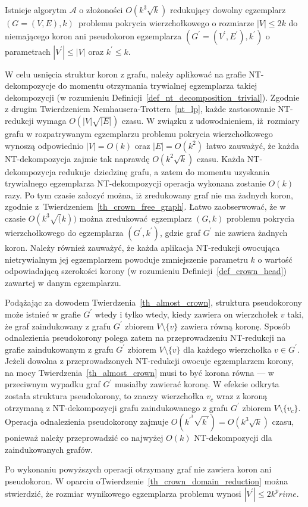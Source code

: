 {  \begin{theorem}
    Istnieje algorytm $\mathcal{A}$ o złożoności $O(k^3\sqrt{k})$ redukujący dowolny egzemplarz $(G=(V, E), k)$ problemu pokrycia wierzchołkowego o rozmiarze $|V|\leq 2k$ do niemającego koron ani pseudokoron egzemplarza $(G^\prime=(V^\prime, E^\prime), k^\prime)$ o parametrach $|V^\prime| \leq |V|$ oraz $k^\prime \leq k$.
  \end{theorem}
  \begin{bproof}
    W celu usnięcia struktur koron z grafu, należy aplikować na grafie NT-dekompozycje do momentu otrzymania trywialnej egzemplarza takiej dekompozycji (w rozumieniu Definicji~\ref{def_nt_decomposition_trivial}).
    Zgodnie z drugim Twierdzeniem Nemhausera-Trottera~\ref{nt_lp}, każde zastosowanie NT-redukcji wymaga $O(|V|\sqrt{|E|})$ czasu.
    W związku z udowodnieniem, iż rozmiary grafu w rozpatrywanym egzemplarzu problemu pokrycia wierzchołkowego wynoszą odpowiednio $|V|=O(k)$ oraz $|E|=O(k^2)$ łatwo zauważyć, że każda NT-dekompozycja zajmie tak naprawdę $O(k^2\sqrt{k})$ czasu.
    Każda NT-dekompozycja redukuje dziedzinę grafu, a zatem do momentu uzyskania trywialnego egzemplarza NT-dekompozycji operacja wykonana zostanie $O(k)$ razy.
    Po tym czasie załozyć można, iż zredukowany graf nie ma żadnych koron, zgodnie z~Twierdzeniem~\ref{th_crown_free_graph}.
    Łatwo zaobserwować, że w czasie $O(k^3\sqrt(k))$ można zredukować egzemplarz $(G, k)$ problemu pokrycia wierzchołkowego do egzemplarza $(G^\prime, k^\prime)$, gdzie graf $G^\prime$ nie zawiera żadnych koron.
    Należy również zauważyć, że każda aplikacja NT-redukcji owocująca nietrywialnym jej egzemplarzem powoduje zmniejszenie parametru $k$ o wartość odpowiadającą szerokości korony (w rozumieniu Definicji~\ref{def_crown_head}) zawartej w danym egzemplarzu.

    Podążając za dowodem Twierdzenia~\ref{th_almost_crown}, struktura pseudokorony może istnieć w grafie $G^\prime$ wtedy i tylko wtedy, kiedy zawiera on wierzchołek $v$ taki, że graf zaindukowany z grafu $G^\prime$ zbiorem $V \setminus \{v\}$ zawiera równą koronę.
    Sposób odnalezienia pseudokorony polega zatem na przeprowadzeniu NT-redukcji na grafie zaindukowanym z grafu $G^\prime$ zbiorem $V \setminus \{v\}$ dla każdego wierzchołka $v \in G^\prime$.
    Jeżeli dowolna z przeprowadzonych NT-redukcji owocuje egzemplarzem korony, na mocy Twierdzenia~\ref{th_almost_crown} musi to być korona równa --- w przeciwnym wypadku graf $G^\prime$ musiałby zawierać koronę.
    W efekcie odkryta została struktura pseudokorony, to znaczy wierzchołka $v_c$ wraz z koroną otrzymaną z NT-dekompozycji grafu zaindukowanego z grafu $G^\prime$ zbiorem $V \setminus \{v_c\}$.
    Operacja odnalezienia pseudokorony zajmuje $O(k^{\prime}^3\sqrt{k^\prime})=O(k^3\sqrt{k})$ czasu, ponieważ należy przeprowadzić co najwyżej $O(k)$ NT-dekompozycji dla zaindukowanych grafów.

    Po wykonaniu powyższych operacji otrzymany graf nie zawiera koron ani pseudokoron.
    W oparciu  oTwierdzenie~\ref{th_crown_domain_reduction} można stwierdzić, że rozmiar wynikowego egzemplarza problemu wynosi $|V^\prime| \leq 2k^prime$.
  \end{bproof}
}

